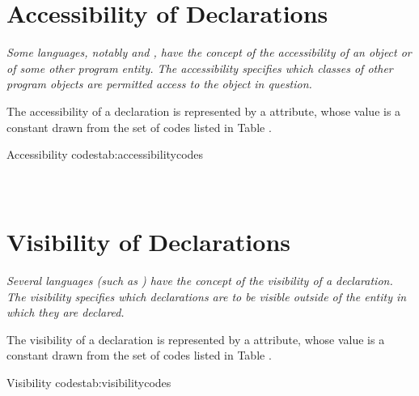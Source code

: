 \section{Accessibility of Declarations}
\label{chap:accessibilityofdeclarations}
\textit{Some languages, notably  and 
, have the concept of
the accessibility of an object or of some other program
entity. The accessibility specifies which classes of other
program objects are permitted access to the object in question.}

The accessibility of a declaration 
is\hypertarget{chap:DWATaccessibilityattribute}{}
represented by a 
\DWATaccessibilityDEFN{} 
attribute, whose value is a constant drawn from the set of codes 
listed in Table .

\begin{simplenametable}[1.9in]{Accessibility codes}{tab:accessibilitycodes}
\DWACCESSpublicTARG{}          \\
\DWACCESSprivateTARG{}        \\
\DWACCESSprotectedTARG{}    \\
\end{simplenametable}

\section{Visibility of Declarations}
\label{chap:visibilityofdeclarations}

\textit{Several languages (such as ) 
have the concept of the visibility of a declaration. The
visibility specifies which declarations are to be 
visible outside of the entity in which they are
declared.}

The\hypertarget{chap:DWATvisibilityvisibilityofdeclaration}{}
visibility of a declaration is represented 
by a \DWATvisibilityDEFN{}
attribute, whose value is a
constant drawn from the set of codes listed in 
Table .

\begin{simplenametable}[1.5in]{Visibility codes}{tab:visibilitycodes}
\DWVISlocalTARG{}          \\
\DWVISexportedTARG{}    \\
\DWVISqualifiedTARG{}  \\
\end{simplenametable}

